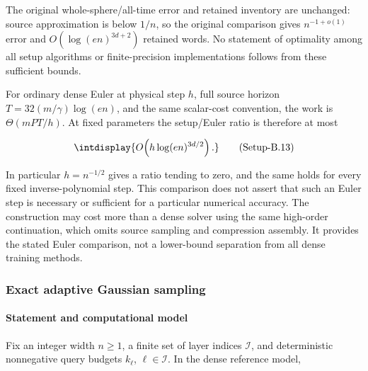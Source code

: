 
The original whole-sphere/all-time error and retained inventory are unchanged: source approximation is below \(1/n\), so the original comparison gives \(n^{-1+o(1)}\) error and \(O(\log(en)^{3d+2})\) retained words. No statement of optimality among all setup algorithms or finite-precision implementations follows from these sufficient bounds.



For ordinary dense Euler at physical step \(h\), full source horizon \(T=32(m/\gamma)\log(en)\), and the same scalar-cost convention, the work is \(\Theta(mPT/h)\). At fixed parameters the setup/Euler ratio is therefore at most


\label{int:eq-setup-b-13}
\begingroup\renewcommand{\theHequation}{intdisplay.1046}
\begin{equation}
\intdisplay{
O\!\left(h\log(en)^{3d/2}\right).
}
\tag{Setup-B.13}
\label{int:eq-0554-setup-b-13}
\end{equation}
\endgroup


In particular \(h=n^{-1/2}\) gives a ratio tending to zero, and the same holds for every fixed inverse-polynomial step. This comparison does not assert that such an Euler step is necessary or sufficient for a particular numerical accuracy. The construction may cost more than a dense solver using the same high-order continuation, which omits source sampling and compression assembly. It provides the stated Euler comparison, not a lower-bound separation from all dense training methods.


\subsubsection{Exact adaptive Gaussian sampling}
\label{int:setup-sampler}

\paragraph{Statement and computational model}
\label{int:setup-sampler-1}
\mbox{}\par\smallskip


Fix an integer width \(n\geq1\), a finite set of layer indices \(\mathcal I\), and deterministic nonnegative query budgets \(k_\ell\), \(\ell\in\mathcal I\). In the dense reference model,


